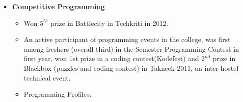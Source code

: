\documentclass[margin,line]{resume}
\begin{document}
\begin{resume}
\begin{itemize}
  \item  \textbf{\textsf Competitive Programming}
    \begin{itemize}
    \item Won $5^{th}$ prize in Battlecity in Techkriti in 2012.
    \item An active participant of programming events in the college, was first among freshers (overall third) in the Semester Programming Contest in first year, won 1st prize in a coding contest(Kodefest) and $2^{nd}$ prize in Blackbox (puzzles and coding contest) in Takneek 2011, an inter-hostel technical event.
    \item Programming Profiles:       
    \end{itemize}

  \end{itemize}


\end{resume}
\end{document}
